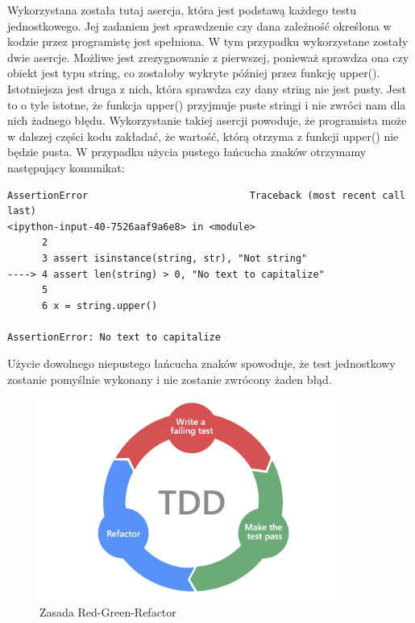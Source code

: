 Wykorzystana została tutaj asercja, która jest podstawą każdego testu jednostkowego. Jej zadaniem jest sprawdzenie czy dana zależność określona w kodzie przez programistę jest spełniona. W tym przypadku wykorzystane zostały dwie asercje. Możliwe jest zrezygnowanie z pierwszej, ponieważ sprawdza ona czy obiekt jest typu string, co zostałoby wykryte później przez funkcję upper(). Istotniejsza jest druga z nich, która sprawdza czy dany string nie jest pusty. Jest to o tyle istotne, że funkcja upper() przyjmuje puste stringi i nie zwróci nam dla nich żadnego błędu. Wykorzystanie takiej asercji powoduje, że programista może w dalszej części kodu zakładać, że wartość, którą otrzyma z funkcji upper() nie będzie pusta. W przypadku użycia pustego łańcucha znaków otrzymamy następujący komunikat: 

\begin{lstlisting}[caption={Błąd asercji podczas testu}]
AssertionError                            Traceback (most recent call last)
<ipython-input-40-7526aaf9a6e8> in <module>
      2 
      3 assert isinstance(string, str), "Not string"
----> 4 assert len(string) > 0, "No text to capitalize"
      5 
      6 x = string.upper()

AssertionError: No text to capitalize
\end{lstlisting}

Użycie dowolnego niepustego łańcucha znaków spowoduje, że test jednostkowy zostanie pomyślnie wykonany i nie zostanie zwrócony żaden błąd. 

\begin{figure}[htbp]
    \centering
    \includegraphics[width=10cm]{images/tdd.png}
    \caption{Zasada Red-Green-Refactor}
    \label{fig:redgreen}
\end{figure}

